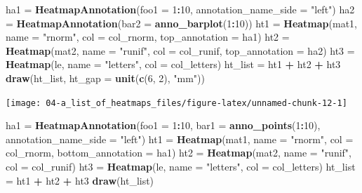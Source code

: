 \documentclass[]{book}
\newenvironment{Shaded}{\begin{snugshade}}{\end{snugshade}}
\newcommand{\KeywordTok}[1]{\textcolor[rgb]{0.13,0.29,0.53}{\textbf{#1}}}
\newcommand{\DataTypeTok}[1]{\textcolor[rgb]{0.13,0.29,0.53}{#1}}
\newcommand{\DecValTok}[1]{\textcolor[rgb]{0.00,0.00,0.81}{#1}}
\newcommand{\StringTok}[1]{\textcolor[rgb]{0.31,0.60,0.02}{#1}}
\newcommand{\OperatorTok}[1]{\textcolor[rgb]{0.81,0.36,0.00}{\textbf{#1}}}
\newcommand{\NormalTok}[1]{#1}
\theoremstyle{definition}
\theoremstyle{definition}
\theoremstyle{definition}
\theoremstyle{remark}
\begin{document}
\begin{Shaded}
\begin{Highlighting}[]
\NormalTok{ha1 =}\StringTok{ }\KeywordTok{HeatmapAnnotation}\NormalTok{(}\DataTypeTok{foo1 =} \DecValTok{1}\OperatorTok{:}\DecValTok{10}\NormalTok{, }\DataTypeTok{annotation_name_side =} \StringTok{"left"}\NormalTok{)}
\NormalTok{ha2 =}\StringTok{ }\KeywordTok{HeatmapAnnotation}\NormalTok{(}\DataTypeTok{bar2 =} \KeywordTok{anno_barplot}\NormalTok{(}\DecValTok{1}\OperatorTok{:}\DecValTok{10}\NormalTok{))}
\NormalTok{ht1 =}\StringTok{ }\KeywordTok{Heatmap}\NormalTok{(mat1, }\DataTypeTok{name =} \StringTok{"rnorm"}\NormalTok{, }\DataTypeTok{col =}\NormalTok{ col_rnorm, }\DataTypeTok{top_annotation =}\NormalTok{ ha1)}
\NormalTok{ht2 =}\StringTok{ }\KeywordTok{Heatmap}\NormalTok{(mat2, }\DataTypeTok{name =} \StringTok{"runif"}\NormalTok{, }\DataTypeTok{col =}\NormalTok{ col_runif, }\DataTypeTok{top_annotation =}\NormalTok{ ha2)}
\NormalTok{ht3 =}\StringTok{ }\KeywordTok{Heatmap}\NormalTok{(le, }\DataTypeTok{name =} \StringTok{"letters"}\NormalTok{, }\DataTypeTok{col =}\NormalTok{ col_letters)}
\NormalTok{ht_list =}\StringTok{ }\NormalTok{ht1 }\OperatorTok{+}\StringTok{ }\NormalTok{ht2 }\OperatorTok{+}\StringTok{ }\NormalTok{ht3}
\KeywordTok{draw}\NormalTok{(ht_list, }\DataTypeTok{ht_gap =} \KeywordTok{unit}\NormalTok{(}\KeywordTok{c}\NormalTok{(}\DecValTok{6}\NormalTok{, }\DecValTok{2}\NormalTok{), }\StringTok{"mm"}\NormalTok{))}
\end{Highlighting}
\end{Shaded}

\begin{center}\texttt{[image: 04-a\_list\_of\_heatmaps\_files/figure-latex/unnamed-chunk-12-1]} \end{center}

\begin{Shaded}
\begin{Highlighting}[]
\NormalTok{ha1 =}\StringTok{ }\KeywordTok{HeatmapAnnotation}\NormalTok{(}\DataTypeTok{foo1 =} \DecValTok{1}\OperatorTok{:}\DecValTok{10}\NormalTok{, }\DataTypeTok{bar1 =} \KeywordTok{anno_points}\NormalTok{(}\DecValTok{1}\OperatorTok{:}\DecValTok{10}\NormalTok{), }\DataTypeTok{annotation_name_side =} \StringTok{"left"}\NormalTok{)}
\NormalTok{ht1 =}\StringTok{ }\KeywordTok{Heatmap}\NormalTok{(mat1, }\DataTypeTok{name =} \StringTok{"rnorm"}\NormalTok{, }\DataTypeTok{col =}\NormalTok{ col_rnorm, }\DataTypeTok{bottom_annotation =}\NormalTok{ ha1)}
\NormalTok{ht2 =}\StringTok{ }\KeywordTok{Heatmap}\NormalTok{(mat2, }\DataTypeTok{name =} \StringTok{"runif"}\NormalTok{, }\DataTypeTok{col =}\NormalTok{ col_runif)}
\NormalTok{ht3 =}\StringTok{ }\KeywordTok{Heatmap}\NormalTok{(le, }\DataTypeTok{name =} \StringTok{"letters"}\NormalTok{, }\DataTypeTok{col =}\NormalTok{ col_letters)}
\NormalTok{ht_list =}\StringTok{ }\NormalTok{ht1 }\OperatorTok{+}\StringTok{ }\NormalTok{ht2 }\OperatorTok{+}\StringTok{ }\NormalTok{ht3}
\KeywordTok{draw}\NormalTok{(ht_list)}
\end{Highlighting}
\end{Shaded}
\end{document}
